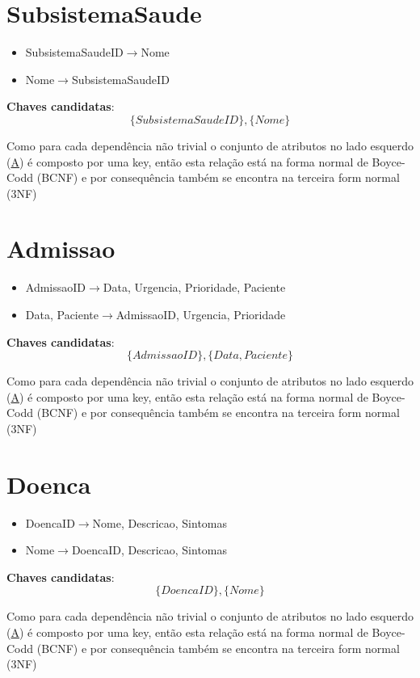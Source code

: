\documentclass[article, a4paper, 12pt, oneside]{memoir}
\begin{document}
\section*{SubsistemaSaude}
\begin{itemize}
	\item SubsistemaSaudeID$\rightarrow$Nome
	\item Nome$\rightarrow$SubsistemaSaudeID
\end{itemize}

\textbf{Chaves candidatas}:\\
\[
\{ SubsistemaSaudeID \}, \{ Nome \}
\]

Como para cada dependência não trivial o conjunto de atributos no lado esquerdo (\underline{A}) é composto por uma key, então esta relação está na forma normal de Boyce-Codd (BCNF) e por consequência também se encontra na terceira form normal (3NF)

\section*{Admissao}
\begin{itemize}
	\item AdmissaoID$\rightarrow$Data, Urgencia, Prioridade, Paciente
	\item Data, Paciente$\rightarrow$AdmissaoID, Urgencia, Prioridade
\end{itemize}

\textbf{Chaves candidatas}:\\
\[
\{ AdmissaoID \}, \{ Data, Paciente \}
\]

Como para cada dependência não trivial o conjunto de atributos no lado esquerdo (\underline{A}) é composto por uma key, então esta relação está na forma normal de Boyce-Codd (BCNF) e por consequência também se encontra na terceira form normal (3NF)

\section*{Doenca}
\begin{itemize}
	\item DoencaID$\rightarrow$Nome, Descricao, Sintomas
	\item Nome$\rightarrow$DoencaID, Descricao, Sintomas
\end{itemize}

\textbf{Chaves candidatas}:\\
\[
\{ DoencaID \}, \{ Nome \}
\]

Como para cada dependência não trivial o conjunto de atributos no lado esquerdo (\underline{A}) é composto por uma key, então esta relação está na forma normal de Boyce-Codd (BCNF) e por consequência também se encontra na terceira form normal (3NF)
\end{document}

